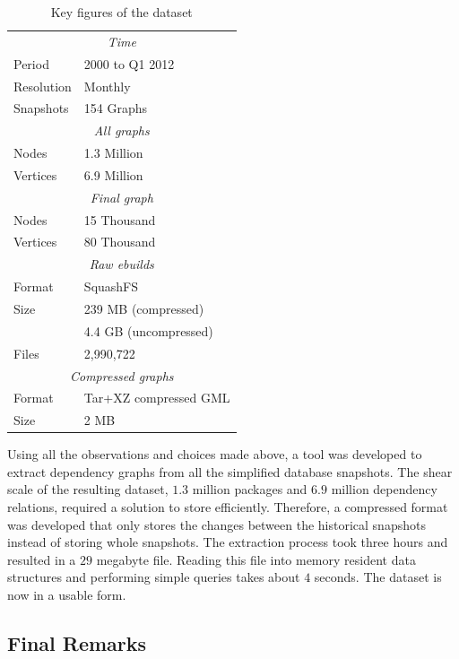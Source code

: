 \documentclass[smallextended,final]{svjour3}
\begin{document}
\begin{table}
\vspace{-1em}
\small\centering
\caption{Key figures of the dataset}\label{tbl:dataset}
\begin{tabular}{ll}
\toprule
\multicolumn{2}{c}{\emph{Time}} \\[0.5mm]
Period & 2000 to Q1 2012 \\
Resolution & Monthly \\
Snapshots & 154 Graphs \\
\midrule
\multicolumn{2}{c}{\emph{All graphs}} \\[0.5mm]
Nodes & 1.3 Million \\
Vertices & 6.9 Million \\
\midrule
\multicolumn{2}{c}{\emph{Final graph}} \\[0.5mm]
Nodes & 15 Thousand \\
Vertices & 80 Thousand \\
\midrule
\multicolumn{2}{c}{\emph{Raw ebuilds}} \\[0.5mm]
Format & SquashFS \\
Size & 239 MB (compressed) \\
 & 4.4 GB (uncompressed) \\
Files & 2,990,722 \\
\midrule
\multicolumn{2}{c}{\emph{Compressed graphs}} \\[0.5mm]
Format & Tar+XZ compressed GML \\
Size & 2 MB \\
\bottomrule
\end{tabular}
\end{table}


Using all the observations and choices made above, a tool was developed to extract dependency graphs from all the simplified database snapshots. The shear scale of the resulting dataset, $1.3$ million packages and $6.9$ million dependency relations, required a solution to store efficiently. Therefore, a compressed format was developed that only stores the changes between the historical snapshots instead of storing whole snapshots. The extraction process took three hours and resulted in a $29$ megabyte file. Reading this file into memory resident data structures and performing simple queries takes about $4$ seconds. The dataset is now in a usable form.

\subsection{Final Remarks}
\end{document}
